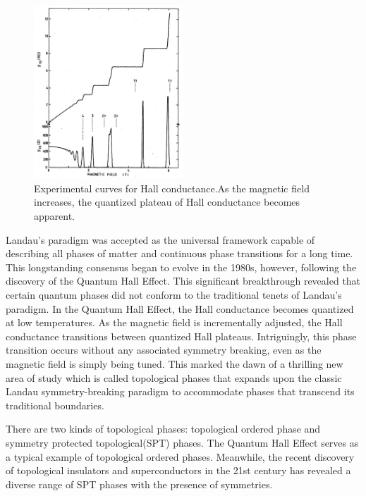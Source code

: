 \begin{figure}[h]
    \centering
    \includegraphics[width =0.5\textwidth]{images/qhe.jpg}
    \caption{Experimental curves for Hall conductance.\cite{von1986quantized}As the magnetic field increases, the quantized plateau of Hall conductance becomes apparent.}
    \label{fig:qhe}
\end{figure}

Landau's paradigm was accepted as the universal framework capable of describing all phases of matter and continuous phase transitions for a long time. This longstanding consensus began to evolve in the 1980s, however, following the discovery of the Quantum Hall Effect\cite{von1986quantized}. This significant breakthrough revealed that certain quantum phases did not conform to the traditional tenets of Landau's paradigm. In the Quantum Hall Effect, the Hall conductance becomes quantized at low temperatures. As the magnetic field is incrementally adjusted, the Hall conductance transitions between quantized Hall plateaus. Intriguingly, this phase transition occurs without any associated symmetry breaking, even as the magnetic field is simply being tuned. This marked the dawn of a thrilling new area of study which is called topological phases that expands upon the classic Landau symmetry-breaking paradigm to accommodate phases that transcend its traditional boundaries.

There are two kinds of topological phases: topological ordered phase and symmetry protected topological(SPT) phases. The Quantum Hall Effect serves as a typical example of topological ordered phases. Meanwhile, the recent discovery of topological insulators and superconductors in the 21st century has revealed a diverse range of SPT phases  with the presence of symmetries.

